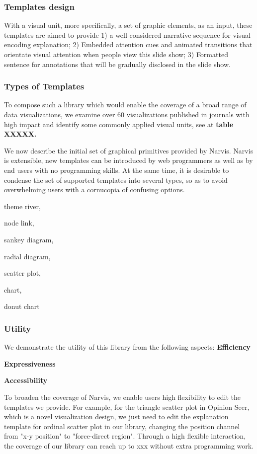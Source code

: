 \documentclass[review,journal]{vgtc}         %
\begin{document}
\subsubsection{Templates design}
With a visual unit, more specifically, a set of graphic elements, as an input, these templates are aimed to provide 1) a well-considered narrative sequence for visual encoding explanation; 2) Embedded attention cues and animated transitions that orientate visual attention  when people view this slide show; 3) Formatted sentence for annotations that will be gradually disclosed in the slide show. 
\subsubsection{Types of Templates}
To compose such a library which would enable the coverage of a broad range of data visualizations, we examine over 60 visualizations published in journals with high impact and identify some commonly applied visual units, see at \textbf{table XXXXX.}\par
We now describe the initial set of graphical primitives provided by Narvis. Narvis is extensible, new templates can be introduced by web programmers as well as by end users with no programming skills. At the same time, it is desirable to condense the set of supported templates into several types, so as to avoid overwhelming users with a cornucopia of confusing options.\par
theme river, \par
node link, \par
sankey diagram, \par
radial diagram,\par
scatter plot,\par 
chart,\par
donut chart\par
\subsubsection{Utility}
We demonstrate the utility of this library from the following aspects:
\textbf{Efficiency}\par
\textbf{Expressiveness}\par
\textbf{Accessibility}\par
To broaden the coverage of Narvis, we enable users high flexibility to edit the templates we provide. For example, for the triangle scatter plot in Opinion Seer\cite{wu_opinionseer:_2010}, which is a novel visualization design, we just need to edit the explanation template for ordinal scatter plot in our library, changing the position channel from "x-y position" to "force-direct region".  
Through a high flexible interaction, the coverage of our library can reach up to xxx  without extra programming work. 
\end{document}
